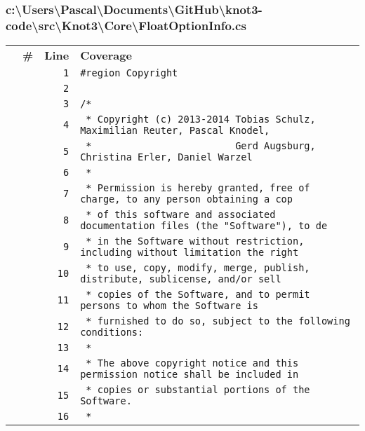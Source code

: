\documentclass[a4paper,10pt]{article}
\begin{document}
\subsubsection{c:\textbackslash Users\textbackslash Pascal\textbackslash Documents\textbackslash GitHub\textbackslash knot3-code\textbackslash src\textbackslash Knot3\textbackslash Core\textbackslash FloatOptionInfo.cs}
\begin{longtable}[l]{lrrl}
\textbf{} & \textbf{\#} & \textbf{Line} & \textbf{Coverage}\\
\cellcolor{gray} &  & \verb~1~ & \verb~#region Copyright~\\
\cellcolor{gray} &  & \verb~2~ & \verb~~\\
\cellcolor{gray} &  & \verb~3~ & \verb~/*~\\
\cellcolor{gray} &  & \verb~4~ & \verb~ * Copyright (c) 2013-2014 Tobias Schulz, Maximilian Reuter, Pascal Knodel,~\\
\cellcolor{gray} &  & \verb~5~ & \verb~ *                         Gerd Augsburg, Christina Erler, Daniel Warzel~\\
\cellcolor{gray} &  & \verb~6~ & \verb~ *~\\
\cellcolor{gray} &  & \verb~7~ & \verb~ * Permission is hereby granted, free of charge, to any person obtaining a cop~\\
\cellcolor{gray} &  & \verb~8~ & \verb~ * of this software and associated documentation files (the "Software"), to de~\\
\cellcolor{gray} &  & \verb~9~ & \verb~ * in the Software without restriction, including without limitation the right~\\
\cellcolor{gray} &  & \verb~10~ & \verb~ * to use, copy, modify, merge, publish, distribute, sublicense, and/or sell~\\
\cellcolor{gray} &  & \verb~11~ & \verb~ * copies of the Software, and to permit persons to whom the Software is~\\
\cellcolor{gray} &  & \verb~12~ & \verb~ * furnished to do so, subject to the following conditions:~\\
\cellcolor{gray} &  & \verb~13~ & \verb~ *~\\
\cellcolor{gray} &  & \verb~14~ & \verb~ * The above copyright notice and this permission notice shall be included in ~\\
\cellcolor{gray} &  & \verb~15~ & \verb~ * copies or substantial portions of the Software.~\\
\cellcolor{gray} &  & \verb~16~ & \verb~ *~\\

\end{longtable}
\end{document}

